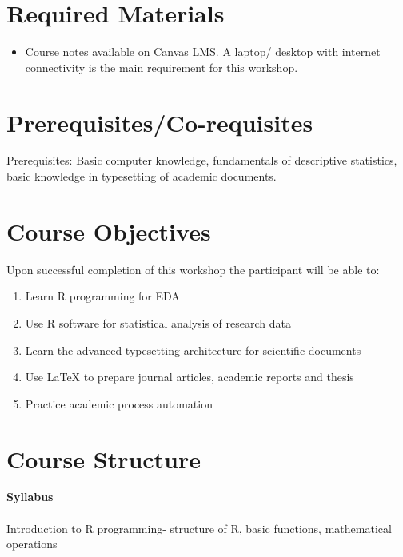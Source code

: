 \documentclass[11pt]{article}
\begin{document}
\section*{Required Materials}

\begin{itemize}
\item Course notes available on Canvas LMS. A laptop/ desktop with internet connectivity is the main requirement for this workshop.
\end{itemize}


\section*{Prerequisites/Co-requisites}
Prerequisites: Basic computer knowledge, fundamentals of descriptive statistics, basic knowledge in typesetting of academic documents.

\section*{Course Objectives}
Upon successful completion of this workshop the participant will be able to:
\begin{enumerate}
\item Learn R programming for EDA
\item Use R software for statistical analysis of research data
\item Learn the advanced typesetting architecture for scientific documents
\item Use \LaTeX{} to prepare journal articles, academic reports and thesis
\item Practice academic process automation
\end{enumerate}


\section*{Course Structure}
{\bf Syllabus}\\

\\
Introduction to R programming- structure of R, basic functions, mathematical operations\\
\end{document}
